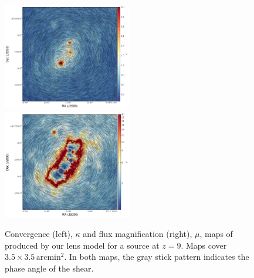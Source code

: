 \begin{figure}[ht]
    \includegraphics[width=0.5\textwidth]{fig/kappaplanck.pdf}
    \includegraphics[width=0.5\textwidth]{fig/magplanck.pdf}
    \caption[Convergence and magnification of our lens model.]{Convergence (left), $\kappa$ and flux magnification (right), $\mu$, maps of \cler produced by our
    lens model for a source at $z=9$. Maps cover $3.5 \times 3.5 \, \textrm{arcmin}^2$. In both maps, the gray
    stick pattern indicates the phase angle of the shear. \label{fig:lens_maps}}
\end{figure}

